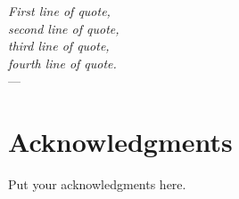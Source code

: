 
\begin{flushright}{\slshape    
    First line of quote, \\ 
    second line of quote, \\ 
    third line of quote, \\
    fourth line of quote.} \\ \medskip
    ---  \citep{famous:1941}
\end{flushright}



\bigskip

\begingroup
\let\clearpage\relax
\let\cleardoublepage\relax
\let\cleardoublepage\relax
\chapter*{Acknowledgments}
Put your acknowledgments here.

\endgroup



